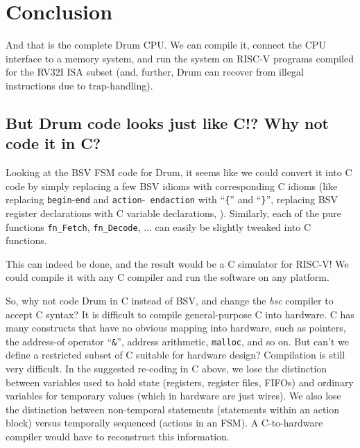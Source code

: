 
\section{Conclusion}

And that is the complete Drum CPU.  We can compile it, connect the CPU
interface to a memory system, and run the system on RISC-V programs
compiled for the RV32I ISA subset (and, further, Drum can recover from
illegal instructions due to trap-handling).


\subsection{But Drum code looks just like C!?  Why not code it in C?}

Looking at the BSV FSM code for Drum, it seems like we could convert
it into C code by simply replacing a few BSV idioms with corresponding
C idioms (like replacing {\tt begin}-{\tt end} and {\tt action}-{\tt
endaction} with ``{\tt \{}'' and ``{\tt \}}'', replacing BSV register
declarations with C variable declarations, {\etc}).  Similarly, each
of the pure functions {\tt fn\_Fetch}, {\tt fn\_Decode}, ...  can
easily be slightly tweaked into C functions.

This can indeed be done, and the result would be a C simulator for
RISC-V!  We could compile it with any C compiler and run the software
on any platform.

So, why not code Drum in C instead of BSV, and change the \emph{bsc}
compiler to accept C syntax?  It is difficult to compile
general-purpose C into hardware.  C has many constructs that have no
obvious mapping into hardware, such as pointers, the address-of
operator ``\verb|&|'', address arithmetic, \verb|malloc|, and so on.
But can't we define a restricted subset of C suitable for hardware
design?  Compilation is still very difficult.  In the suggested
re-coding in C above, we lose the distinction between variables used
to hold state (registers, register files, FIFOs) and ordinary
variables for temporary values (which in hardware are just wires).  We
also lose the distinction between non-temporal statements (statements
within an action block) versus temporally sequenced (actions in an
FSM).  A C-to-hardware compiler would have to reconstruct this
information.


